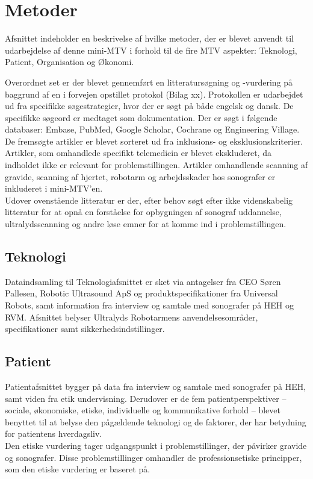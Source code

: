 \chapter{Metoder}
Afsnittet indeholder en beskrivelse af hvilke metoder, der er blevet anvendt til udarbejdelse af denne mini-MTV i forhold til de fire MTV aspekter: Teknologi, Patient, Organisation og Økonomi.

Overordnet set er der blevet gennemført en litteratursøgning og -vurdering på baggrund af en i forvejen opstillet protokol (Bilag xx). Protokollen er udarbejdet ud fra specifikke søgestrategier, hvor der er søgt på både engelsk og dansk. De specifikke søgeord er medtaget som dokumentation. Der er søgt i følgende databaser: Embase, PubMed, Google Scholar, Cochrane og Engineering Village. \\
De fremsøgte artikler er blevet sorteret ud fra inklusions- og eksklusionskriterier. Artikler, som omhandlede specifikt telemedicin er blevet ekskluderet, da indholdet ikke er relevant for problemstillingen. Artikler omhandlende scanning af gravide, scanning af hjertet, robotarm og arbejdsskader hos sonografer er inkluderet i mini-MTV’en.\\
Udover ovenstående litteratur er der, efter behov søgt efter ikke videnskabelig litteratur for at opnå en forståelse for opbygningen af sonograf uddannelse, ultralydsscanning og andre løse emner for at komme ind i problemstillingen. 

\section{Teknologi}
Dataindsamling til Teknologiafsnittet er sket via antagelser fra CEO Søren Pallesen, Robotic Ultrasound ApS og produktspecifikationer fra Universal Robots, samt information fra interview og samtale med sonografer på HEH og RVM. Afsnittet belyser Ultralyds Robotarmens anvendelsesområder, specifikationer samt sikkerhedsindstillinger.
\section{Patient}
Patientafsnittet bygger på data fra interview og samtale med sonografer på HEH, samt viden fra etik undervisning. Derudover er de fem patientperspektiver – sociale, økonomiske, etiske, individuelle og kommunikative forhold – blevet benyttet til at belyse den pågældende teknologi og de faktorer, der har betydning for patientens hverdagsliv.\\ 
Den etiske vurdering tager udgangspunkt i problemstillinger, der påvirker gravide og sonografer. Disse problemstillinger omhandler de professionsetiske principper, som den etiske vurdering er baseret på.
